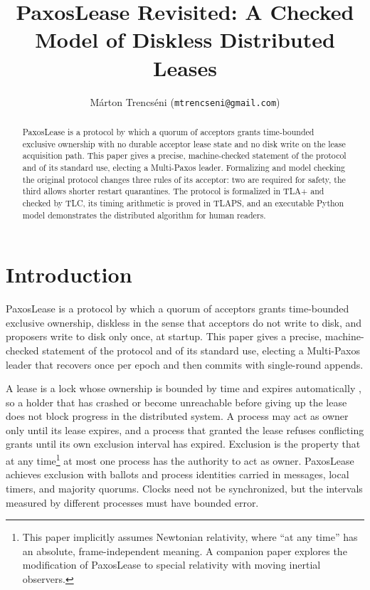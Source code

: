\documentclass[final,5p,times,twocolumn,number]{elsarticle}
\newcommand{\code}[1]{\texttt{#1}}
\begin{document}
\begin{frontmatter}

\title{PaxosLease Revisited: A Checked Model of Diskless Distributed Leases}

\author{M\'arton Trencs\'eni (\code{mtrencseni@gmail.com})}

\begin{abstract}
PaxosLease is a protocol by which a quorum of acceptors grants time-bounded exclusive ownership with no durable acceptor lease state and no disk write on the lease acquisition path.  This paper gives a precise, machine-checked statement of the protocol and of its standard use, electing a Multi-Paxos leader.  Formalizing and model checking the original protocol changes three rules of its acceptor: two are required for safety, the third allows shorter restart quarantines.  The protocol is formalized in TLA+ and checked by TLC, its timing arithmetic is proved in TLAPS, and an executable Python model demonstrates the distributed algorithm for human readers.
\end{abstract}

\end{frontmatter}

\section{Introduction}\label{sec:intro}

PaxosLease \cite{ref1} is a protocol by which a quorum of acceptors grants time-bounded exclusive ownership, diskless in the sense that acceptors do not write to disk, and proposers write to disk only once, at startup.  This paper gives a precise, machine-checked statement of the protocol and of its standard use, electing a Multi-Paxos leader that recovers once per epoch and then commits with single-round appends.

A lease is a lock whose ownership is bounded by time and expires automatically \cite{ref3}, so a holder that has crashed or become unreachable before giving up the lease does not block progress in the distributed system.  A process may act as owner only until its lease expires, and a process that granted the lease refuses conflicting grants until its own exclusion interval has expired.  Exclusion is the property that at any time\footnote{This paper implicitly assumes Newtonian relativity, where ``at any time'' has an absolute, frame-independent meaning.  A companion paper explores the modification of PaxosLease to special relativity with moving inertial observers.} at most one process has the authority to act as owner.  PaxosLease achieves exclusion with ballots and process identities carried in messages, local timers, and majority quorums.  Clocks need not be synchronized, but the intervals measured by different processes must have bounded error.
\end{document}
